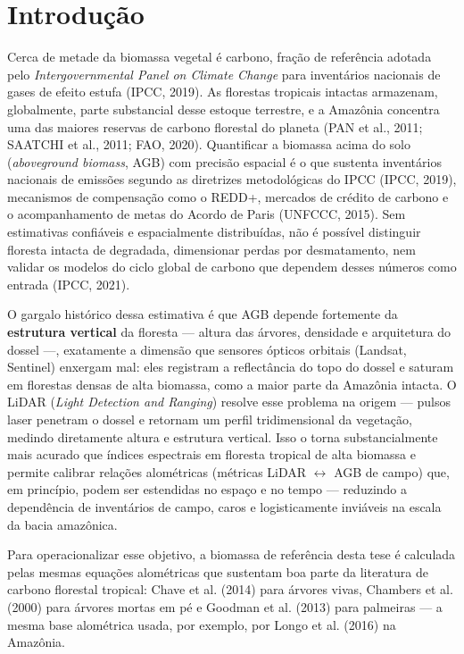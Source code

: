 \section{Introdução}
\label{sec:intro}

Cerca de metade da biomassa vegetal é carbono, fração de referência adotada
pelo \textit{Intergovernmental Panel on Climate Change} para inventários
nacionais de gases de efeito estufa (IPCC, 2019). As florestas tropicais
intactas armazenam, globalmente, parte substancial desse estoque terrestre, e
a Amazônia concentra uma das maiores reservas de carbono florestal do planeta
(PAN et al., 2011; SAATCHI et al., 2011; FAO, 2020). Quantificar a biomassa
acima do solo (\textit{aboveground biomass}, AGB) com precisão espacial é o
que sustenta inventários nacionais de emissões segundo as diretrizes
metodológicas do IPCC (IPCC, 2019), mecanismos de compensação como o REDD+,
mercados de crédito de carbono e o acompanhamento de metas do Acordo de Paris
(UNFCCC, 2015). Sem estimativas confiáveis e espacialmente distribuídas, não é
possível distinguir floresta intacta de degradada, dimensionar perdas por
desmatamento, nem validar os modelos do ciclo global de carbono que dependem
desses números como entrada (IPCC, 2021).

O gargalo histórico dessa estimativa é que AGB depende fortemente da
\textbf{estrutura vertical} da floresta --- altura das árvores, densidade e
arquitetura do dossel ---, exatamente a dimensão que sensores ópticos orbitais
(Landsat, Sentinel) enxergam mal: eles registram a reflectância do topo do
dossel e saturam em florestas densas de alta biomassa, como a maior parte da
Amazônia intacta. O LiDAR (\textit{Light Detection and Ranging}) resolve esse
problema na origem --- pulsos laser penetram o dossel e retornam um perfil
tridimensional da vegetação, medindo diretamente altura e estrutura vertical.
Isso o torna substancialmente mais acurado que índices espectrais em floresta
tropical de alta biomassa e permite calibrar relações alométricas (métricas
LiDAR $\leftrightarrow$ AGB de campo) que, em princípio, podem ser estendidas no
espaço e no tempo --- reduzindo a dependência de inventários de campo, caros e
logisticamente inviáveis na escala da bacia amazônica.

Para operacionalizar esse objetivo, a biomassa de referência desta tese é
calculada pelas mesmas equações alométricas que sustentam boa parte da
literatura de carbono florestal tropical: Chave et al. (2014) para árvores
vivas, Chambers et al. (2000) para árvores mortas em pé e Goodman et al.
(2013) para palmeiras --- a mesma base alométrica usada, por exemplo, por
Longo et al. (2016) na Amazônia.

